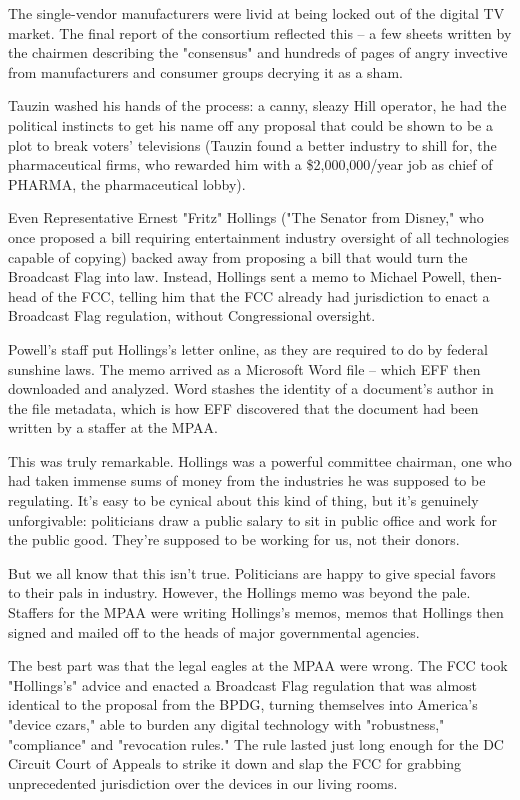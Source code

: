 The single-vendor manufacturers were livid at being locked out of
the digital TV market. The final report of the consortium reflected
this -- a few sheets written by the chairmen describing the
"consensus" and hundreds of pages of angry invective from
manufacturers and consumer groups decrying it as a sham.

Tauzin washed his hands of the process: a canny, sleazy Hill
operator, he had the political instincts to get his name off any
proposal that could be shown to be a plot to break voters'
televisions (Tauzin found a better industry to shill for, the
pharmaceutical firms, who rewarded him with a \$2,000,000/year job
as chief of PHARMA, the pharmaceutical lobby).

Even Representative Ernest "Fritz" Hollings ("The Senator from
Disney," who once proposed a bill requiring entertainment industry
oversight of all technologies capable of copying) backed away from
proposing a bill that would turn the Broadcast Flag into law.
Instead, Hollings sent a memo to Michael Powell, then-head of the
FCC, telling him that the FCC already had jurisdiction to enact a
Broadcast Flag regulation, without Congressional oversight.

Powell's staff put Hollings's letter online, as they are required
to do by federal sunshine laws. The memo arrived as a Microsoft
Word file -- which EFF then downloaded and analyzed. Word stashes
the identity of a document's author in the file metadata, which is
how EFF discovered that the document had been written by a staffer
at the MPAA.

This was truly remarkable. Hollings was a powerful committee
chairman, one who had taken immense sums of money from the
industries he was supposed to be regulating. It's easy to be
cynical about this kind of thing, but it's genuinely unforgivable:
politicians draw a public salary to sit in public office and work
for the public good. They're supposed to be working for us, not
their donors.

But we all know that this isn't true. Politicians are happy to give
special favors to their pals in industry. However, the Hollings
memo was beyond the pale. Staffers for the MPAA were writing
Hollings's memos, memos that Hollings then signed and mailed off to
the heads of major governmental agencies.

The best part was that the legal eagles at the MPAA were wrong. The
FCC took "Hollings's" advice and enacted a Broadcast Flag
regulation that was almost identical to the proposal from the BPDG,
turning themselves into America's "device czars," able to burden
any digital technology with "robustness," "compliance" and
"revocation rules." The rule lasted just long enough for the DC
Circuit Court of Appeals to strike it down and slap the FCC for
grabbing unprecedented jurisdiction over the devices in our living
rooms.

